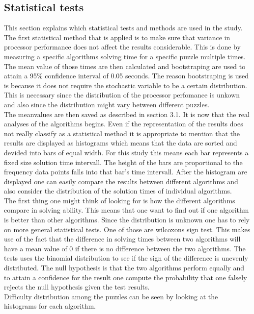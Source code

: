\documentclass[a4paper,11pt]{kth-mag}
\begin{document}
\subsection{Statistical tests}
This section explains which statistical tests and methods are used in the study.
The first statistical method that is applied is to make sure that variance in processor performance does not affect the results considerable. 
This is done by measuring a specific algorithms solving time for a specific puzzle multiple times. 
The mean value of those times are then calculated and bootstraping are used to attain a 95\% confidence interval of 0.05 seconds. 
The reason bootstraping is used is because it does not require the stochastic variable to be a certain distribution. 
This is necessary since the distribution of the processor perfomance is unkown and also since the distribution might vary between different puzzles. \\
The meanvalues are then saved as described in section 3.1.
It is now that the real analyses of the algorithms begins. 
Even if the representation of the results does not really classify as a statistical method it is appropriate to mention that the results are displayed as histograms which means that the data are sorted and devided into bars of equal width. 
For this study this means each bar represents a fixed size solution time intervall. 
The height of the bars are proportional to the frequency data points falls into that bar's time intervall.
After the histogram are displayed one can easily compare the results between different algorithms and also consider the distribution of the solution times of individual algorithms.\\
The first thing one might think of looking for is how the different algorithms compare in solving ability. 
This means that one want to find out if one algorithm is better than other algorithms. 
Since the distribution is unknown one has to rely on more general statistical tests. 
One of those are wilcoxons sign test. 
This makes use of the fact that the difference in solving times between two algorithms will have a mean value of 0 if there is no difference between the two algorithms. 
The tests uses the binomial distribution to see if the sign of the difference is unevenly distributed.
The null hypothesis is that the two algorithms perform equally and to attain a confidence for the result one compute the probability that one falsely rejects the null hypothesis given the test results.
\\
Difficulty distribution among the puzzles can be seen by looking at the histograms for each algorithm.
\end{document}
